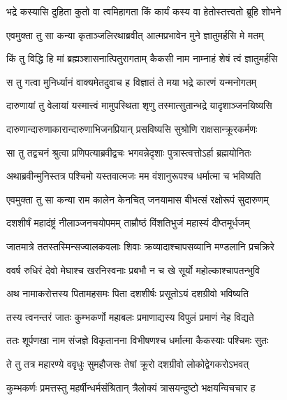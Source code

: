 \twolineshloka
{भद्रे कस्यासि दुहिता कुतो वा त्वमिहागता}
{किं कार्यं कस्य वा हेतोस्तत्त्वतो ब्रूहि शोभने} %

\twolineshloka
{एवमुक्ता तु सा कन्या कृताञ्जलिरथाब्रवीत्}
{आत्मप्रभावेन मुने ज्ञातुमर्हसि मे मतम्} %

\twolineshloka
{किं तु विद्धि हि मां ब्रह्मञ्शासनात्पितुरागताम्}
{कैकसी नाम नाम्नाहं शेषं त्वं ज्ञातुमर्हसि} %

\twolineshloka
{स तु गत्वा मुनिर्ध्यानं वाक्यमेतदुवाच ह}
{विज्ञातं ते मया भद्रे कारणं यन्मनोगतम्} %

\twolineshloka
{दारुणायां तु वेलायां यस्मात्त्वं मामुपस्थिता}
{शृणु तस्मात्सुतान्भद्रे यादृशाञ्जनयिष्यसि} %

\twolineshloka
{दारुणान्दारुणाकारान्दारुणाभिजनप्रियान्}
{प्रसविष्यसि सुश्रोणि राक्षसान्क्रूरकर्मणः} %

\twolineshloka
{सा तु तद्वचनं श्रुत्वा प्रणिपत्याब्रवीद्वचः}
{भगवन्नेदृशाः पुत्रास्त्वत्तोऽर्हा ब्रह्मयोनितः} %

\twolineshloka
{अथाब्रवीन्मुनिस्तत्र पश्चिमो यस्तवात्मजः}
{मम वंशानुरूपश्च धर्मात्मा च भविष्यति} %

\twolineshloka
{एवमुक्ता तु सा कन्या राम कालेन केनचित्}
{जनयामास बीभत्सं रक्षोरूपं सुदारुणम्} %

\twolineshloka
{दशशीर्षं महादंष्ट्रं नीलाञ्जनचयोपमम्}
{ताम्रौष्ठं विंशतिभुजं महास्यं दीप्तमूर्धजम्} %

\twolineshloka
{जातमात्रे ततस्तस्मिन्सज्वालकवलाः शिवाः}
{क्रव्यादाश्चापसव्यानि मण्डलानि प्रचक्रिरे} %

\twolineshloka
{ववर्ष रुधिरं देवो मेघाश्च खरनिस्वनाः}
{प्रबभौ न च खे सूर्यो महोल्काश्चापतन्भुवि} %

\twolineshloka
{अथ नामाकरोत्तस्य पितामहसमः पिता}
{दशशीर्षः प्रसूतोऽयं दशग्रीवो भविष्यति} %

\twolineshloka
{तस्य त्वनन्तरं जातः कुम्भकर्णो महाबलः}
{प्रमाणाद्यस्य विपुलं प्रमाणं नेह विद्यते} %

\twolineshloka
{ततः शूर्पणखा नाम संजज्ञे विकृतानना}
{विभीषणश्च धर्मात्मा कैकस्याः पश्चिमः सुतः} %

\twolineshloka
{ते तु तत्र महारण्ये ववृधुः सुमहौजसः}
{तेषां क्रूरो दशग्रीवो लोकोद्वेगकरोऽभवत्} %

\twolineshloka
{कुम्भकर्णः प्रमत्तस्तु महर्षीन्धर्मसंश्रितान्}
{त्रैलोक्यं त्रासयन्दुष्टो भक्षयन्विचचार ह} %

